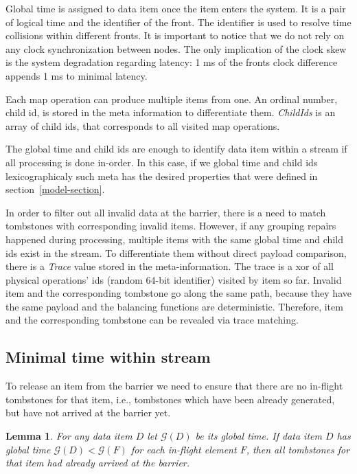 Global time is assigned to data item once the item enters the system. It is a pair of logical time and the identifier of the front. The identifier is used to resolve time collisions within different fronts. It is important to notice that we do not rely on any clock synchronization between nodes. The only implication of the clock skew is the system degradation regarding latency: 1 ms of the fronts clock difference appends 1 ms to minimal latency.

Each map operation can produce multiple items from one.  An ordinal number, child id, is stored in the meta information to differentiate them. {\it ChildIds} is an array of child ids, that corresponds to all visited map operations.

The global time and child ids are enough to identify data item within a stream if all processing is done in-order. In this case, if we global time and child ids lexicographicaly such meta has the desired properties that were defined in section~\ref{model-section}. 

In order to filter out all invalid data at the barrier, there is a need to match tombstones with corresponding invalid items. However, if any grouping repairs happened during processing, multiple items with the same global time and child ids exist in the stream. To differentiate them without direct payload comparison, there is a {\it Trace} value stored in the meta-information. The trace is a xor of all physical operations' ids (random 64-bit identifier) visited by item so far. Invalid item and the corresponding tombstone go along the same path, because they have the same payload and the balancing functions are deterministic. Therefore, item and the corresponding tombstone can be revealed via trace matching. 

\label{mininal-time}

\subsection{Minimal time within stream}

To release an item from the barrier we need to ensure that there are no in-flight tombstones for that item, i.e., tombstones which have been already generated, but have not arrived at the barrier yet.

\newtheorem{minimal-time-claim}{Lemma}

\begin{minimal-time-claim}
For any data item $D$ let $\mathcal{G} (D)$ be its global time. 
  If data item $D$ has global time $\mathcal{G} (D) < \mathcal{G} (F)$ for each in-flight element $F$, 
  then all tombstones for that item had already arrived at the barrier.
\end{minimal-time-claim}

